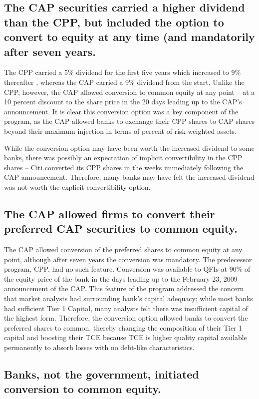 \documentclass[12pt]{article}
\begin{document}
\subsection{The CAP securities carried a higher dividend than the CPP, but included the option to convert to equity at any time (and mandatorily after seven years.}


The CPP carried a 5\% dividend for the first five years which increased to 9\% thereafter , whereas the CAP carried a 9\% dividend from the start. Unlike the CPP, however, the CAP allowed conversion to common equity at any point -- at a 10 percent discount to the share price in the 20 days leading up to the CAP's announcement. It is clear this conversion option was a key component of the program, as the CAP allowed banks to exchange their CPP shares to CAP shares beyond their maximum injection in terms of percent of risk-weighted assets.


While the conversion option may have been worth the increased dividend to some banks, there was possibly an expectation of implicit convertibility in the CPP shares -- Citi converted its CPP shares in the weeks immediately following the CAP announcement. Therefore, many banks may have felt the increased dividend was not worth the explicit convertibility option.

\subsection{The CAP allowed firms to convert their preferred CAP securities to common equity.}


The CAP allowed conversion of the preferred shares to common equity at any point, although after seven years the conversion was mandatory. The predecessor program, CPP, had no such feature. Conversion was available to QFIs at 90\% of the equity price of the bank in the days leading up to the February 23, 2009 announcement of the CAP. This feature of the program addressed the concern that market analysts had surrounding bank's capital adequacy; while most banks had sufficient Tier 1 Capital, many analysts felt there was insufficient capital of the highest form. Therefore, the conversion option allowed banks to convert the preferred shares to common, thereby changing the composition of their Tier 1 capital and boosting their TCE because TCE is higher quality capital available permanently to absorb losses with no debt-like characteristics.


\subsection{Banks, not the government, initiated conversion to common equity.}
\end{document}
